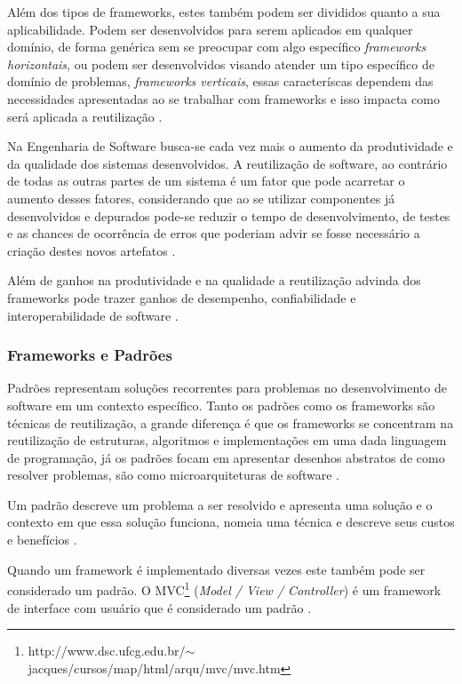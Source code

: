 Além dos tipos de frameworks, estes também podem ser divididos quanto a sua aplicabilidade. Podem ser desenvolvidos para serem aplicados em qualquer domínio, de forma genérica sem se preocupar com algo específico \textit{frameworks horizontais}, ou podem ser desenvolvidos visando atender um tipo específico de domínio de problemas, \textit{frameworks verticais}, essas caracteríscas dependem das necessidades apresentadas ao se trabalhar com frameworks e isso impacta como será aplicada a reutilização \cite{Kroth:2000}.

Na Engenharia de Software busca-se cada vez mais o aumento da produtividade e da qualidade dos sistemas desenvolvidos. A reutilização de software, ao contrário de todas as outras partes de um sistema é um fator que pode acarretar o aumento desses fatores, considerando que ao se utilizar componentes já desenvolvidos e depurados pode-se reduzir o tempo de desenvolvimento, de testes e as chances de ocorrência de erros que poderiam advir se fosse necessário a criação destes novos artefatos \cite{Silva:2000}.

Além de ganhos na produtividade e na qualidade a reutilização advinda dos frameworks pode trazer ganhos de desempenho, confiabilidade e interoperabilidade de software \cite{Fayad:Schimidt:1997}.

\subsubsection{Frameworks e Padrões}

Padrões representam soluções recorrentes para problemas no desenvolvimento de software em um contexto específico. Tanto os padrões como os frameworks são técnicas de reutilização, a grande diferença é que os frameworks 	se concentram na reutilização de estruturas, algoritmos e implementações em uma dada linguagem de programação, já os padrões focam em apresentar desenhos abstratos de como resolver problemas, são como microarquiteturas de software \cite{Fayad:Schimidt:1997}.

Um padrão descreve um problema a ser resolvido e apresenta uma solução e o contexto em que essa solução funciona, nomeia uma técnica e descreve seus custos e benefícios \cite{Johnson:1997}.

Quando um framework é implementado diversas vezes este também pode ser considerado um padrão. O MVC\footnote{http://www.dsc.ufcg.edu.br/$\sim$jacques/cursos/map/html/arqu/mvc/mvc.htm} (\textit{Model / View / Controller}) é um framework de interface com usuário que é considerado um padrão \cite{Johnson:1997}.

